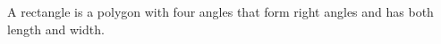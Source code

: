 \documentclass[preview]{standalone}
\begin{document}
\begin{center}
A rectangle is a polygon with four angles that form right angles and has both length and width.
\end{center}
\end{document}
